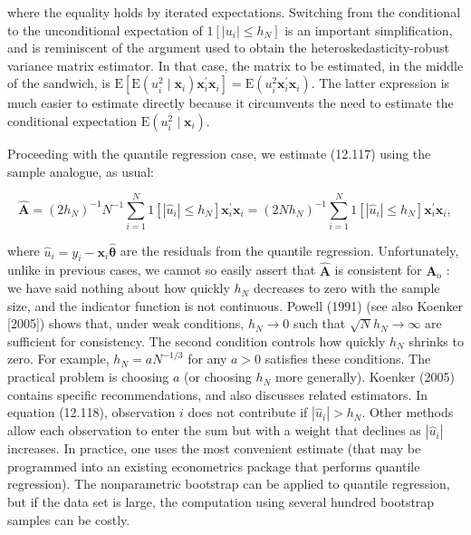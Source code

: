 \documentclass[10pt]{article}
\begin{document}
where the equality holds by iterated expectations. Switching from the conditional to the unconditional expectation of $1\left[\left|u_{i}\right| \leq h_{N}\right]$ is an important simplification, and is reminiscent of the argument used to obtain the heteroskedasticity-robust variance matrix estimator. In that case, the matrix to be estimated, in the middle of the sandwich, is $\mathrm{E}\left[\mathrm{E}\left(u_{i}^{2} \mid \mathbf{x}_{i}\right) \mathbf{x}_{i}^{\prime} \mathbf{x}_{i}\right]=\mathrm{E}\left(u_{i}^{2} \mathbf{x}_{i}^{\prime} \mathbf{x}_{i}\right)$. The latter expression is much easier to estimate directly because it circumvents the need to estimate the conditional expectation $\mathrm{E}\left(u_{i}^{2} \mid \mathbf{x}_{i}\right)$.

Proceeding with the quantile regression case, we estimate (12.117) using the sample analogue, as usual:


\begin{equation*}
\hat{\mathbf{A}}=\left(2 h_{N}\right)^{-1} N^{-1} \sum_{i=1}^{N} 1\left[\left|\hat{u}_{i}\right| \leq h_{N}\right] \mathbf{x}_{i}^{\prime} \mathbf{x}_{i}=\left(2 N h_{N}\right)^{-1} \sum_{i=1}^{N} 1\left[\left|\hat{u}_{i}\right| \leq h_{N}\right] \mathbf{x}_{i}^{\prime} \mathbf{x}_{i}, \tag{12.118}
\end{equation*}


where $\hat{u}_{i}=y_{i}-\mathbf{x}_{i} \hat{\boldsymbol{\theta}}$ are the residuals from the quantile regression. Unfortunately, unlike in previous cases, we cannot so easily assert that $\hat{\mathbf{A}}$ is consistent for $\mathbf{A}_{\mathrm{o}}$ : we have said nothing about how quickly $h_{N}$ decreases to zero with the sample size, and the indicator function is not continuous. Powell (1991) (see also Koenker [2005]) shows that, under weak conditions, $h_{N} \rightarrow 0$ such that $\sqrt{N} h_{N} \rightarrow \infty$ are sufficient for consistency. The second condition controls how quickly $h_{N}$ shrinks to zero. For example, $h_{N}=a N^{-1 / 3}$ for any $a>0$ satisfies these conditions. The practical problem is choosing $a$ (or choosing $h_{N}$ more generally). Koenker (2005) contains specific recommendations, and also discusses related estimators. In equation (12.118), observation $i$ does not contribute if $\left|\hat{u}_{i}\right|>h_{N}$. Other methods allow each observation to enter the sum but with a weight that declines as $\left|\hat{u}_{i}\right|$ increases. In practice, one uses the most convenient estimate (that may be programmed into an existing econometrics package that performs quantile regression). The nonparametric bootstrap can be applied to quantile regression, but if the data set is large, the computation using several hundred bootstrap samples can be costly.
\end{document}
